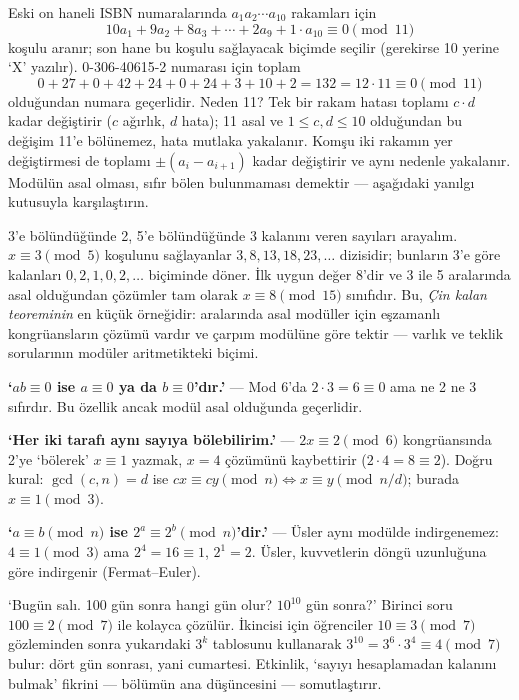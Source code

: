 \begin{ornek}
Eski on haneli ISBN numaralarında $a_1a_2\cdots a_{10}$ rakamları için
\[
10a_1+9a_2+8a_3+\cdots+2a_9+1\cdot a_{10}\equiv0 \pmod{11}
\]
koşulu aranır; son hane bu koşulu sağlayacak biçimde seçilir (gerekirse 10 yerine ‘X’ yazılır). 0-306-40615-2 numarası için toplam
\[
0+27+0+42+24+0+24+3+10+2=132=12\cdot11\equiv0 \pmod{11}
\]
olduğundan numara geçerlidir. Neden 11? Tek bir rakam hatası toplamı $c\cdot d$ kadar değiştirir ($c$ ağırlık, $d$ hata); 11 asal ve $1\le c,d\le10$ olduğundan bu değişim 11’e bölünemez, hata mutlaka yakalanır. Komşu iki rakamın yer değiştirmesi de toplamı $\pm(a_i-a_{i+1})$ kadar değiştirir ve aynı nedenle yakalanır. Modülün asal olması, sıfır bölen bulunmaması demektir — aşağıdaki yanılgı kutusuyla karşılaştırın.
\end{ornek}

\begin{ornek}
3’e bölündüğünde 2, 5’e bölündüğünde 3 kalanını veren sayıları arayalım. $x\equiv3\pmod5$ koşulunu sağlayanlar $3,8,13,18,23,\dots$ dizisidir; bunların 3’e göre kalanları $0,2,1,0,2,\dots$ biçiminde döner. İlk uygun değer 8’dir ve 3 ile 5 aralarında asal olduğundan çözümler tam olarak $x\equiv8\pmod{15}$ sınıfıdır. Bu, \emph{Çin kalan teoreminin} en küçük örneğidir: aralarında asal modüller için eşzamanlı kongrüansların çözümü vardır ve çarpım modülüne göre tektir — varlık ve teklik sorularının modüler aritmetikteki biçimi.
\end{ornek}

\begin{yanilgi}
\textbf{‘$ab\equiv0$ ise $a\equiv0$ ya da $b\equiv0$’dır.’} — Mod 6’da $2\cdot3=6\equiv0$ ama ne 2 ne 3 sıfırdır. Bu özellik ancak modül asal olduğunda geçerlidir.

\smallskip
\textbf{‘Her iki tarafı aynı sayıya bölebilirim.’} — $2x\equiv2\pmod6$ kongrüansında 2’ye ‘bölerek’ $x\equiv1$ yazmak, $x=4$ çözümünü kaybettirir ($2\cdot4=8\equiv2$). Doğru kural: $\gcd(c,n)=d$ ise $cx\equiv cy\pmod n\iff x\equiv y\pmod{n/d}$; burada $x\equiv1\pmod3$.

\smallskip
\textbf{‘$a\equiv b\pmod n$ ise $2^a\equiv2^b\pmod n$’dir.’} — Üsler aynı modülde indirgenemez: $4\equiv1\pmod3$ ama $2^4=16\equiv1$, $2^1=2$. Üsler, kuvvetlerin döngü uzunluğuna göre indirgenir (Fermat–Euler).
\end{yanilgi}

\begin{sinif}
‘Bugün salı. 100 gün sonra hangi gün olur? $10^{10}$ gün sonra?’ Birinci soru $100\equiv2\pmod7$ ile kolayca çözülür. İkincisi için öğrenciler $10\equiv3\pmod7$ gözleminden sonra yukarıdaki $3^k$ tablosunu kullanarak $3^{10}=3^{6}\cdot3^4\equiv4\pmod7$ bulur: dört gün sonrası, yani cumartesi. Etkinlik, ‘sayıyı hesaplamadan kalanını bulmak’ fikrini — bölümün ana düşüncesini — somutlaştırır.
\end{sinif}

